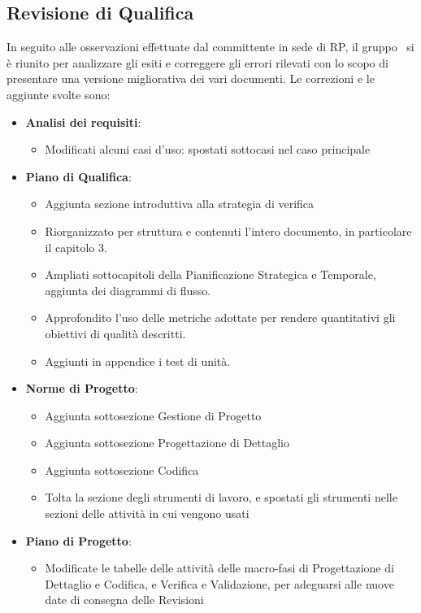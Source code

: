 \subsection{Revisione di Qualifica}
In seguito alle osservazioni effettuate dal committente in sede di RP, il gruppo \gruppo\ si è riunito per analizzare gli esiti e correggere gli errori rilevati con lo scopo di presentare una versione migliorativa dei vari documenti.
Le correzioni e le aggiunte svolte sono:

\begin{itemize}
	\item \textbf{Analisi dei requisiti}:
	\begin{itemize}
		\item Modificati alcuni casi d'uso: spostati sottocasi nel caso principale
	\end{itemize}
	\item \textbf{Piano di Qualifica}:
	\begin{itemize}
		\item Aggiunta sezione introduttiva alla strategia di verifica
		\item Riorganizzato per struttura e contenuti l'intero documento, in particolare il capitolo 3.
		\item Ampliati sottocapitoli della Pianificazione Strategica e Temporale, aggiunta dei diagrammi di flusso.
		\item Approfondito l'uso delle metriche adottate per rendere quantitativi gli obiettivi di qualità descritti.
		\item Aggiunti in appendice i test di unità.
	\end{itemize}
	\item \textbf{Norme di Progetto}:
	\begin{itemize}
		\item Aggiunta sottosezione Gestione di Progetto
		\item Aggiunta sottosezione Progettazione di Dettaglio
		\item Aggiunta sottosezione Codifica
		\item Tolta la sezione degli strumenti di lavoro, e spostati gli strumenti nelle sezioni delle attività in cui vengono usati
	\end{itemize}
	\item \textbf{Piano di Progetto}:
	\begin{itemize}
		\item Modificate le tabelle delle attività delle macro-fasi di Progettazione di Dettaglio e Codifica, e Verifica e Validazione, per adeguarsi alle nuove date di consegna delle Revisioni

\end{itemize}
\end{itemize}
